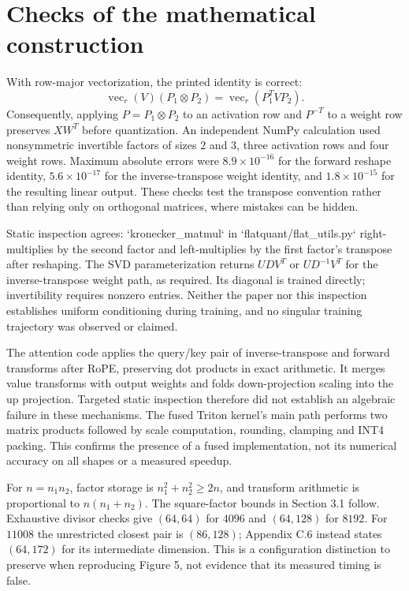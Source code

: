 \documentclass[10pt]{article}
\begin{document}
\section*{Checks of the mathematical construction}
With row-major vectorization, the printed identity is correct: \[\operatorname{vec}_r(V)(P_1\otimes P_2)
 =\operatorname{vec}_r(P_1^TVP_2).\] Consequently, applying \(P=P_1\otimes P_2\) to an activation row and \(P^{-T}\) to a weight row preserves \(XW^T\) before quantization. An independent NumPy calculation used nonsymmetric invertible factors of sizes \(2\) and \(3\), three activation rows and four weight rows. Maximum absolute errors were \(8.9\times10^{-16}\) for the forward reshape identity, \(5.6\times10^{-17}\) for the inverse-transpose weight identity, and \(1.8\times10^{-15}\) for the resulting linear output. These checks test the transpose convention rather than relying only on orthogonal matrices, where mistakes can be hidden.\par
Static inspection agrees: `kronecker\_matmul` in `flatquant/flat\_utils.py` right-multiplies by the second factor and left-multiplies by the first factor’s transpose after reshaping. The SVD parameterization returns \(U D V^T\) or \(U D^{-1}V^T\) for the inverse-transpose weight path, as required. Its diagonal is trained directly; invertibility requires nonzero entries. Neither the paper nor this inspection establishes uniform conditioning during training, and no singular training trajectory was observed or claimed.\par
The attention code applies the query/key pair of inverse-transpose and forward transforms after RoPE, preserving dot products in exact arithmetic. It merges value transforms with output weights and folds down-projection scaling into the up projection. Targeted static inspection therefore did not establish an algebraic failure in these mechanisms. The fused Triton kernel’s main path performs two matrix products followed by scale computation, rounding, clamping and INT4 packing. This confirms the presence of a fused implementation, not its numerical accuracy on all shapes or a measured speedup.\par
For \(n=n_1n_2\), factor storage is \(n_1^2+n_2^2\ge2n\), and transform arithmetic is proportional to \(n(n_1+n_2)\). The square-factor bounds in Section 3.1 follow. Exhaustive divisor checks give \((64,64)\) for \(4096\) and \((64,128)\) for \(8192\). For \(11008\) the unrestricted closest pair is \((86,128)\); Appendix C.6 instead states \((64,172)\) for its intermediate dimension. This is a configuration distinction to preserve when reproducing Figure 5, not evidence that its measured timing is false.\par
\end{document}
